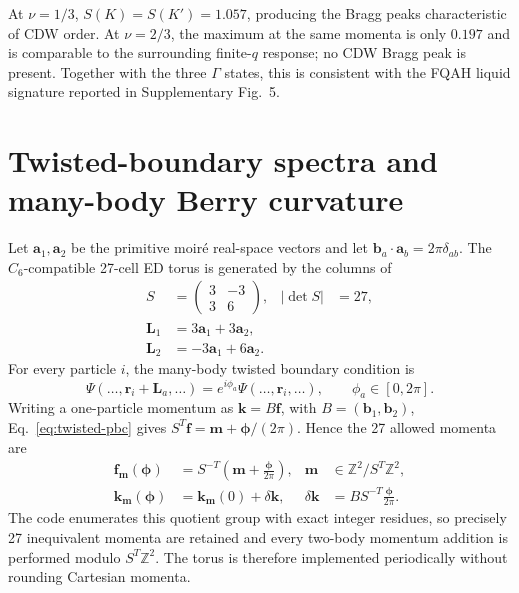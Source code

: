 \documentclass[10pt,twocolumn]{article}
\begin{document}
At $\nu=1/3$, $S(K)=S(K')=1.057$, producing the Bragg peaks characteristic of CDW order.  At $\nu=2/3$, the maximum at the same momenta is only $0.197$ and is comparable to the surrounding finite-$q$ response; no CDW Bragg peak is present.  Together with the three $\Gamma$ states, this is consistent with the FQAH liquid signature reported in Supplementary Fig.~5.

\section{Twisted-boundary spectra and many-body Berry curvature}

Let $\bm a_1,\bm a_2$ be the primitive moir\'e real-space vectors and let
$\bm b_a\!\cdot\!\bm a_b=2\pi\delta_{ab}$.  The $C_6$-compatible 27-cell
ED torus is generated by the columns of
\begin{equation}
 \begin{aligned}
 S&=\begin{pmatrix}3&-3\\3&6\end{pmatrix},& |\det S|&=27,\\
 \bm L_1&=3\bm a_1+3\bm a_2,\\
 \bm L_2&=-3\bm a_1+6\bm a_2.
 \end{aligned}
 \label{eq:supercell-pbc}
\end{equation}
For every particle $i$, the many-body twisted boundary condition is
\begin{equation}
 \Psi(\ldots,\bm r_i+\bm L_a,\ldots)
 =e^{i\phi_a}\Psi(\ldots,\bm r_i,\ldots),
 \qquad \phi_a\in[0,2\pi].
 \label{eq:twisted-pbc}
\end{equation}
Writing a one-particle momentum as $\bm k=B\bm f$, with
$B=(\bm b_1,\bm b_2)$, Eq.~\eqref{eq:twisted-pbc} gives
$S^T\bm f=\bm m+\bm\phi/(2\pi)$.  Hence the 27 allowed momenta are
\begin{align}
 \bm f_{\bm m}(\bm\phi)&=S^{-T}
 \left(\bm m+\frac{\bm\phi}{2\pi}\right),
 &\bm m&\in\mathbb Z^2/S^T\mathbb Z^2,\\
 \bm k_{\bm m}(\bm\phi)&=\bm k_{\bm m}(0)+\delta\bm k,
 &\delta\bm k&=B S^{-T}\frac{\bm\phi}{2\pi}.
 \label{eq:twist-kshift}
\end{align}
The code enumerates this quotient group with exact integer residues, so
precisely 27 inequivalent momenta are retained and every two-body momentum
addition is performed modulo $S^T\mathbb Z^2$.  The torus is therefore
implemented periodically without rounding Cartesian momenta.
\end{document}
